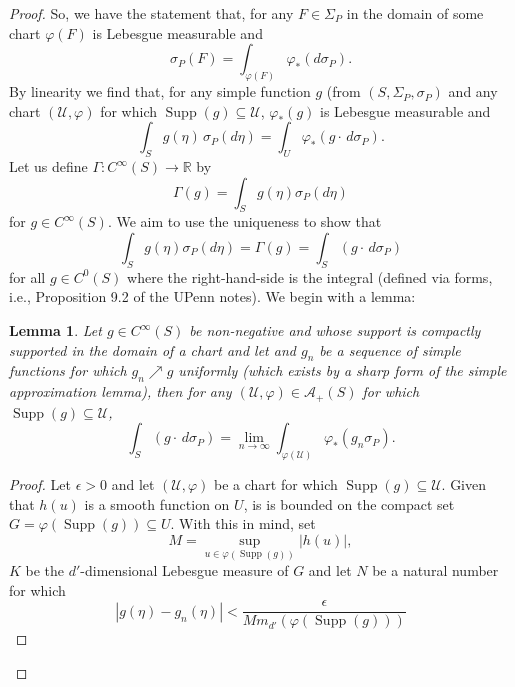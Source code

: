 \documentclass[11pt]{article}
\newtheorem{lemma}[theorem]{Lemma}
\newcommand\supp{\operatorname{Supp}}
\begin{document}
\begin{proof}
So, we have the statement that, for any $F\in\Sigma_P$ in the domain of some chart $\varphi(F)$ is Lebesgue measurable and
\begin{equation*}
    \sigma_P(F)=\int_{\varphi(F)}\varphi_*(d\sigma_P).
\end{equation*}
By linearity we find that, for any simple function $g$ (from $(S,\Sigma_P,\sigma_P)$ and any chart $(\mathcal{U},\varphi)$ for which $\supp(g)\subseteq \mathcal{U}$, $\varphi_*(g)$ is Lebesgue measurable and
\begin{equation*}
  \int_S g(\eta)\,\sigma_P(d\eta)=\int_{U}\varphi_*(g\cdot\,d\sigma_P).  
\end{equation*}
Let us define $\Gamma:C^\infty(S)\to\mathbb{R}$ by
\begin{equation*}
   \Gamma(g)= \int_S g(\eta)\sigma_P(d\eta)
\end{equation*}
for $g\in C^\infty(S)$. We aim to use the uniqueness to show that
\begin{equation*}
    \int_S g(\eta)\sigma_P(d\eta)=\Gamma(g)=\int_S (g\cdot\,d\sigma_P)
\end{equation*}
for all $g\in C^0(S)$ where the right-hand-side is the integral (defined via forms, i.e., Proposition 9.2 of the UPenn notes). We begin with a lemma:
\begin{lemma}
Let $g\in C^\infty(S)$ be non-negative and whose support is compactly supported in the domain of a chart and let and $g_n$ be a sequence of simple functions for which $g_n\nearrow g$ uniformly (which exists by a sharp form of the simple approximation lemma), then for any $(\mathcal{U},\varphi)\in\mathcal{A}_+(S)$ for which $\supp(g)\subseteq \mathcal{U}$,
\begin{equation*}
    \int_S(g\cdot \,d\sigma_P)=\lim_{n\to\infty}\int_{\varphi(\mathcal{U})}\varphi_*(g_n\sigma_P).
\end{equation*}
\end{lemma}
\begin{proof}
Let $\epsilon>0$ and let $(\mathcal{U},\varphi)$ be a chart for which $\supp(g)\subseteq\mathcal{U}$. Given that $h(u)$ is a smooth function on $U$, is is bounded on the compact set $G=\varphi(\supp(g))\subseteq U$. With this in mind, set
\begin{equation*}
    M=\sup_{u\in \varphi(\supp(g))}|h(u)|,
\end{equation*}
$K$ be the $d'$-dimensional Lebesgue measure of $G$ and let $N$ be a natural number for which
\begin{equation*}
    |g(\eta)-g_n(\eta)|<\frac{\epsilon}{M m_{d'}(\varphi(\supp(g)))}

\end{equation*}
\end{proof}
\end{proof}
\end{document}
